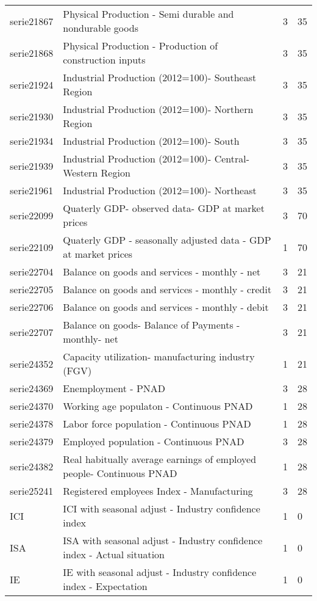 \documentclass{article}
\begin{document}
\begin{landscape}
\begin{center}
\begin{longtable}{|l|l|l|l|}
serie21867 & Physical Production - Semi durable and nondurable goods & 3 & 35 \\
serie21868 & Physical Production - Production of construction inputs & 3 & 35 \\
serie21924 & Industrial Production (2012=100)- Southeast Region & 3 & 35 \\
serie21930 & Industrial Production (2012=100)- Northern Region & 3 & 35 \\
serie21934 & Industrial Production (2012=100)- South & 3 & 35 \\
serie21939 & Industrial Production (2012=100)- Central- Western Region & 3 & 35 \\
serie21961 & Industrial Production (2012=100)- Northeast & 3 & 35 \\
serie22099 & Quaterly GDP- observed data- GDP at market prices & 3 & 70 \\
serie22109 & Quaterly GDP - seasonally adjusted data - GDP at market prices & 1 & 70 \\
serie22704 & Balance on goods and services - monthly - net & 3 & 21 \\
serie22705 & Balance on goods and services - monthly - credit & 3 & 21 \\
serie22706 & Balance on goods and services - monthly - debit & 3 & 21 \\
serie22707 & Balance on goods- Balance of Payments - monthly- net & 3 & 21 \\
serie24352 & Capacity utilization- manufacturing industry (FGV) & 1 & 21 \\
serie24369 & Enemployment - PNAD & 3 & 28 \\
serie24370 & Working age populaton - Continuous PNAD & 1 & 28 \\
serie24378 & Labor force population - Continuous PNAD & 1 & 28 \\
serie24379 & Employed population - Continuous PNAD & 3 & 28 \\
serie24382 & Real habitually average earnings of employed people- Continuous PNAD & 1 & 28 \\
serie25241 & Registered employees Index - Manufacturing & 3 & 28 \\
ICI & ICI with seasonal adjust - Industry confidence index & 1 & 0 \\
ISA & ISA with seasonal adjust - Industry confidence index - Actual situation & 1 & 0 \\
IE & IE with seasonal adjust - Industry confidence index - Expectation & 1 & 0 \\

\end{longtable}
\end{center}
\end{landscape}
\end{document}
